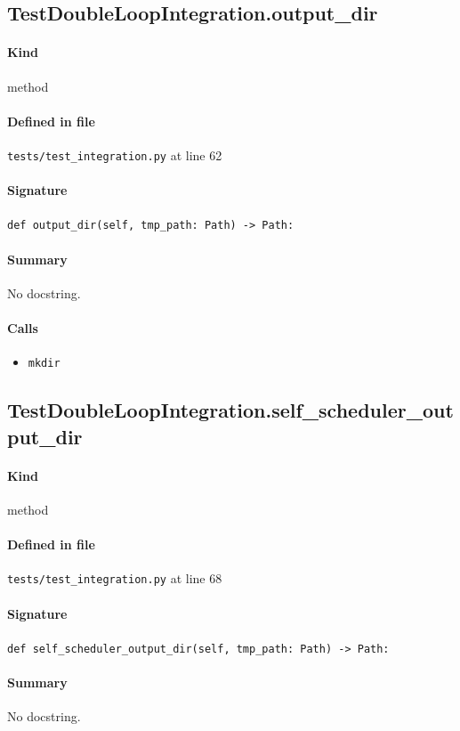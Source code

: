 \documentclass[11pt]{report}
\begin{document}
\subsection{TestDoubleLoopIntegration.output\_dir}
\label{def:tests-test_integration.py:TestDoubleLoopIntegration.output_dir:L62}
\paragraph{Kind} method
\paragraph{Defined in file} \texttt{tests/test\_integration.py} at line 62
\paragraph{Signature} \texttt{def output\_dir(self, tmp\_path: Path) -> Path:}
\paragraph{Summary} No docstring.
\paragraph{Calls}
\begin{itemize}[leftmargin=*]
  \item \texttt{mkdir}
\end{itemize}
\subsection{TestDoubleLoopIntegration.self\_scheduler\_output\_dir}
\label{def:tests-test_integration.py:TestDoubleLoopIntegration.self_scheduler_output_dir:L68}
\paragraph{Kind} method
\paragraph{Defined in file} \texttt{tests/test\_integration.py} at line 68
\paragraph{Signature} \texttt{def self\_scheduler\_output\_dir(self, tmp\_path: Path) -> Path:}
\paragraph{Summary} No docstring.
\end{document}
